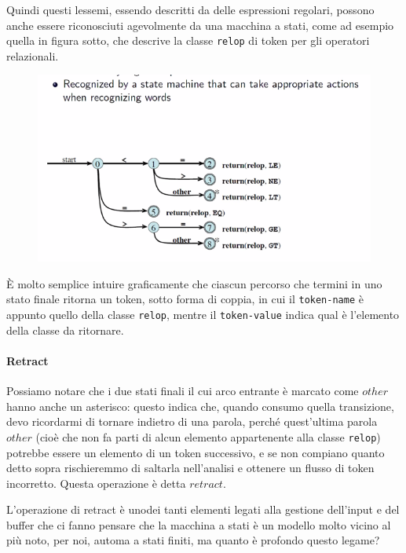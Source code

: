 \documentclass[class=book, crop=false, oneside, 12pt]{standalone}
\begin{document}
Quindi questi lessemi, essendo descritti da delle espressioni regolari, possono anche essere riconosciuti agevolmente da una macchina a stati, come ad esempio quella in figura sotto, che descrive la classe \texttt{relop} di token per gli operatori relazionali.
\begin{figure}[H]
    \centering
    \includegraphics[width=\textwidth,keepaspectratio]{lec-14-1}
    \caption{}
\end{figure}
È molto semplice intuire graficamente che ciascun percorso che termini in uno stato finale ritorna un token, sotto forma di coppia, in cui il \texttt{token-name} è appunto quello della classe \texttt{relop}, mentre il \texttt{token-value} indica qual è l'elemento della classe da ritornare.

\paragraph{Retract}
Possiamo notare che i due stati finali il cui arco entrante è marcato come \(other\) hanno anche un asterisco: questo indica che, quando consumo quella transizione, devo ricordarmi di tornare indietro di una parola, perché quest'ultima parola \(other\) (cioè che non fa parti di alcun elemento appartenente alla classe \texttt{relop}) potrebbe essere un elemento di un token successivo, e se non compiano quanto detto sopra rischieremmo di saltarla nell'analisi e ottenere un flusso di token incorretto. Questa operazione è detta \(retract\).

L'operazione di retract è unodei tanti elementi legati alla gestione dell'input e del buffer che ci fanno pensare che la macchina a stati è un modello molto vicino al più noto, per noi, automa a stati finiti, ma quanto è profondo questo legame?
\end{document}
